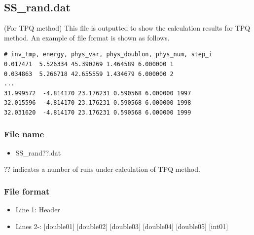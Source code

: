 \subsection{SS\_rand.dat}
\label{Subsec:ssrand}
(For TPQ method) This file is outputted to show the calculation results for TPQ method.
An example of file format is shown as follows.\\
\begin{minipage}{15cm}
\begin{screen}
\begin{verbatim}
# inv_tmp, energy, phys_var, phys_doublon, phys_num, step_i
0.017471  5.526334 45.390269 1.464589 6.000000 1
0.034863  5.266718 42.655559 1.434679 6.000000 2
...
31.999572  -4.814170 23.176231 0.590568 6.000000 1997
32.015596  -4.814170 23.176231 0.590568 6.000000 1998
32.031620  -4.814170 23.176231 0.590568 6.000000 1999
\end{verbatim}
\end{screen}
\end{minipage}

\subsubsection{File name}
 \begin{itemize}
   \item SS\_rand??.dat
  \end{itemize}
  ?? indicates a number of runs under calculation of TPQ method.

\subsubsection{File format}
\begin{itemize}
   \item Line 1: Header
   \item Lines 2-: $[$double01$]$ $[$double02$]$ $[$double03$]$ $[$double04$]$ $[$double05$]$ $[$int01$]$
  \end{itemize}
